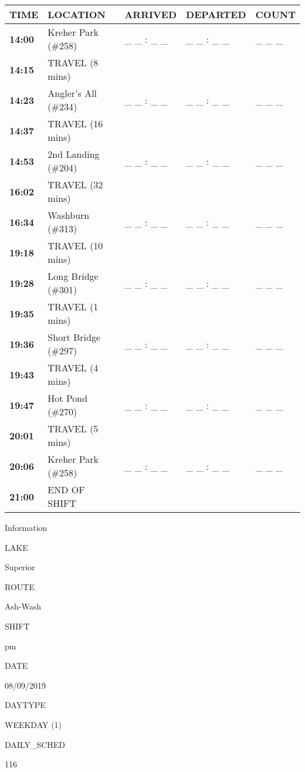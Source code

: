 \documentclass[]{article}
\begin{document}
\begin{tabular}{>{\bfseries}lllll}
\toprule
\textbf{TIME} & \textbf{LOCATION} & \textbf{ARRIVED} & \textbf{DEPARTED} & \textbf{COUNT}\\
\midrule
14:00 & Kreher Park (\#258) & \_ \_ : \_ \_ & \_ \_ : \_ \_ & \_ \_ \_\\
14:15 & TRAVEL (8 mins) &  &  & \\
14:23 & Angler's All (\#234) & \_ \_ : \_ \_ & \_ \_ : \_ \_ & \_ \_ \_\\
14:37 & TRAVEL (16 mins) &  &  & \\
14:53 & 2nd Landing (\#204) & \_ \_ : \_ \_ & \_ \_ : \_ \_ & \_ \_ \_\\
16:02 & TRAVEL (32 mins) &  &  & \\
16:34 & Washburn (\#313) & \_ \_ : \_ \_ & \_ \_ : \_ \_ & \_ \_ \_\\
19:18 & TRAVEL (10 mins) &  &  & \\
19:28 & Long Bridge (\#301) & \_ \_ : \_ \_ & \_ \_ : \_ \_ & \_ \_ \_\\
19:35 & TRAVEL (1 mins) &  &  & \\
19:36 & Short Bridge (\#297) & \_ \_ : \_ \_ & \_ \_ : \_ \_ & \_ \_ \_\\
19:43 & TRAVEL (4 mins) &  &  & \\
19:47 & Hot Pond (\#270) & \_ \_ : \_ \_ & \_ \_ : \_ \_ & \_ \_ \_\\
20:01 & TRAVEL (5 mins) &  &  & \\
20:06 & Kreher Park (\#258) & \_ \_ : \_ \_ & \_ \_ : \_ \_ & \_ \_ \_\\
21:00 & END OF SHIFT &  &  & \\
\bottomrule
\end{tabular}\newpage

Information

LAKE

Superior

ROUTE

Ash-Wash

SHIFT

pm

DATE

08/09/2019

DAYTYPE

WEEKDAY (1)

DAILY\_SCHED

116

\vspace{24pt}
\end{document}

